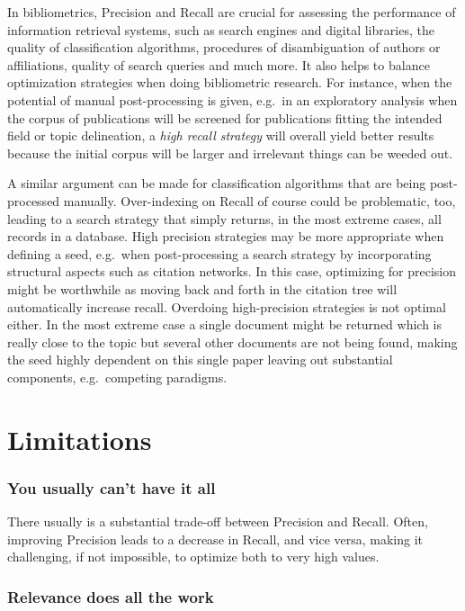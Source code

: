 \documentclass[
  letterpaper,
]{scrreprt}
\begin{document}
In bibliometrics, Precision and Recall are crucial for assessing the
performance of information retrieval systems, such as search engines and
digital libraries, the quality of classification algorithms, procedures
of disambiguation of authors or affiliations, quality of search queries
and much more. It also helps to balance optimization strategies when
doing bibliometric research. For instance, when the potential of manual
post-processing is given, e.g.~in an exploratory analysis when the
corpus of publications will be screened for publications fitting the
intended field or topic delineation, a \emph{high recall strategy} will
overall yield better results because the initial corpus will be larger
and irrelevant things can be weeded out.

A similar argument can be made for classification algorithms that are
being post-processed manually. Over-indexing on Recall of course could
be problematic, too, leading to a search strategy that simply returns,
in the most extreme cases, all records in a database. High precision
strategies may be more appropriate when defining a seed, e.g.~when
post-processing a search strategy by incorporating structural aspects
such as citation networks. In this case, optimizing for precision might
be worthwhile as moving back and forth in the citation tree will
automatically increase recall. Overdoing high-precision strategies is
not optimal either. In the most extreme case a single document might be
returned which is really close to the topic but several other documents
are not being found, making the seed highly dependent on this single
paper leaving out substantial components, e.g.~competing paradigms.

\section{Limitations}\label{limitations-4}

\subsubsection{You usually can't have it
all}\label{you-usually-cant-have-it-all}

There usually is a substantial trade-off between Precision and Recall.
Often, improving Precision leads to a decrease in Recall, and vice
versa, making it challenging, if not impossible, to optimize both to
very high values.

\subsubsection{Relevance does all the
work}\label{relevance-does-all-the-work}
\end{document}
